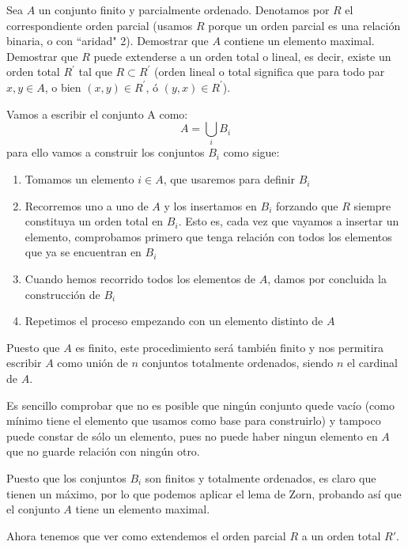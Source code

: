 	\begin{problem}[2]
	Sea $A$ un conjunto finito y parcialmente ordenado. Denotamos por $R$ el correspondiente
	orden parcial (usamos $R$ porque un orden parcial es una relaci\'on binaria, o con ``aridad" 2). Demostrar que
	$A$ contiene un elemento maximal. Demostrar que $R$ puede extenderse a un orden total o lineal,
	es decir, existe un orden total  $R^\prime$ tal que $R\subset R^\prime$ (orden lineal o total
	significa que para todo par
	$x, y\in A$, o bien $(x,y)\in R^\prime$, \'o $(y,x)\in R^\prime$).
	\solution
	
	

	Vamos a escribir el conjunto A como:
	\[A = \bigcup_i B_i\]
	para ello vamos a construir los conjuntos $B_i$ como sigue:
	\begin{enumerate}
	\item Tomamos un elemento $i \in A$, que usaremos para definir $B_i$
	\item Recorremos uno a uno de $A$ y los insertamos en $B_i$ forzando que $R$ siempre constituya un orden total en $B_i$. Esto es, cada vez que vayamos a insertar un elemento, comprobamos primero que tenga relación con todos los elementos que ya se encuentran en $B_i$
	\item Cuando hemos recorrido todos los elementos de $A$, damos por concluida la construcción de $B_i$
	\item Repetimos el proceso empezando con un elemento distinto de $A$
	\end{enumerate}
	
	Puesto que $A$ es finito, este procedimiento será también finito y nos permitira escribir $A$ como unión de $n$ conjuntos totalmente ordenados, siendo $n$ el cardinal de $A$.
	
	Es sencillo comprobar que no es posible que ningún conjunto quede vacío (como mínimo tiene el elemento que usamos como base para construirlo) y tampoco puede constar de sólo un elemento, pues no puede haber ningun elemento en $A$ que no guarde relación con ningún otro.

	Puesto que los conjuntos $B_i$ son finitos y totalmente ordenados, es claro que tienen un máximo, por lo que podemos aplicar el lema de Zorn, probando así que el conjunto $A$ tiene un elemento maximal.

	Ahora tenemos que ver como extendemos el orden parcial $R$ a un orden total $R'$. 

	
	\end{problem}
	
